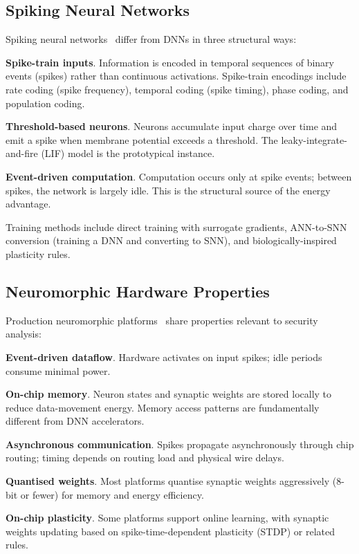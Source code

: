 \documentclass[sigconf,nonacm]{acmart}
\begin{document}
\subsection{Spiking Neural Networks}

Spiking neural networks~\cite{eshraghian2023snntorch,
maass1997noisy} differ from DNNs in three structural ways:

\textbf{Spike-train inputs}. Information is encoded in temporal
sequences of binary events (spikes) rather than continuous
activations. Spike-train encodings include rate coding (spike
frequency), temporal coding (spike timing), phase coding, and
population coding.

\textbf{Threshold-based neurons}. Neurons accumulate input charge
over time and emit a spike when membrane potential exceeds a
threshold. The leaky-integrate-and-fire (LIF) model is the
prototypical instance.

\textbf{Event-driven computation}. Computation occurs only at
spike events; between spikes, the network is largely idle. This is
the structural source of the energy advantage.

Training methods include direct training with surrogate gradients,
ANN-to-SNN conversion (training a DNN and converting to SNN), and
biologically-inspired plasticity rules.

\subsection{Neuromorphic Hardware Properties}

Production neuromorphic platforms~\cite{intel2024loihi,
ibm2024northpole,brainchip2024akida,spinnaker2024arch} share
properties relevant to security analysis:

\textbf{Event-driven dataflow}. Hardware activates on input
spikes; idle periods consume minimal power.

\textbf{On-chip memory}. Neuron states and synaptic weights are
stored locally to reduce data-movement energy. Memory access
patterns are fundamentally different from DNN accelerators.

\textbf{Asynchronous communication}. Spikes propagate
asynchronously through chip routing; timing depends on routing
load and physical wire delays.

\textbf{Quantised weights}. Most platforms quantise synaptic
weights aggressively (8-bit or fewer) for memory and energy
efficiency.

\textbf{On-chip plasticity}. Some platforms support online
learning, with synaptic weights updating based on spike-time-dependent
plasticity (STDP) or related rules.
\end{document}
